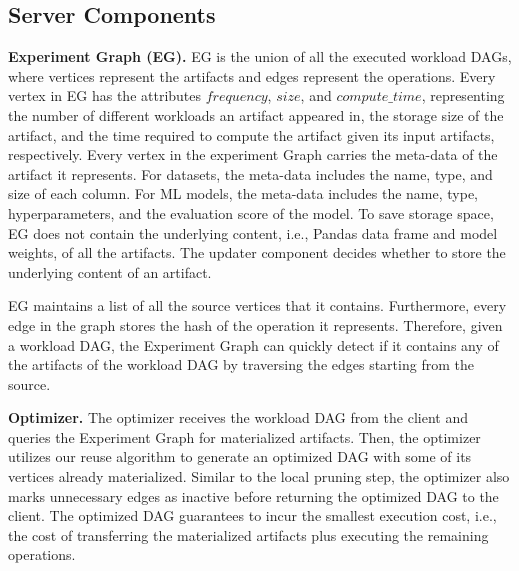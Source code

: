 \subsection{Server Components}
\textbf{Experiment Graph (EG).}
EG is the union of all the executed workload DAGs, where vertices represent the artifacts and edges represent the operations.
Every vertex in EG has the attributes $frequency$, $size$, and $compute\_time$, representing the number of different workloads an artifact appeared in, the storage size of the artifact, and the time required to compute the artifact given its input artifacts, respectively.
Every vertex in the experiment Graph carries the meta-data of the artifact it represents.
For datasets, the meta-data includes the name, type, and size of each column.
For ML models, the meta-data includes the name, type, hyperparameters, and the evaluation score of the model.
To save storage space, EG does not contain the underlying content, i.e., Pandas data frame and model weights, of all the artifacts.
The updater component decides whether to store the underlying content of an artifact.

EG maintains a list of all the source vertices that it contains.
Furthermore, every edge in the graph stores the hash of the operation it represents.
Therefore, given a workload DAG, the Experiment Graph can quickly detect if it contains any of the artifacts of the workload DAG by traversing the edges starting from the source.

\textbf{Optimizer. }
The optimizer receives the workload DAG from the client and queries the Experiment Graph for materialized artifacts.
Then, the optimizer utilizes our reuse algorithm to generate an optimized DAG with some of its vertices already materialized.
Similar to the local pruning step, the optimizer also marks unnecessary edges as inactive before returning the optimized DAG to the client.
The optimized DAG guarantees to incur the smallest execution cost, i.e., the cost of transferring the materialized artifacts plus executing the remaining operations.


